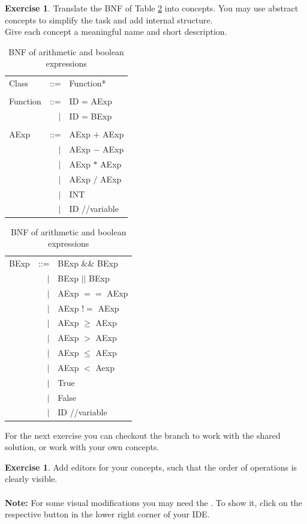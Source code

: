 \documentclass[a4paper,oneside,DIV8,10pt]{scrartcl}
\theoremstyle{definition}
\newtheorem{aufgabe}[satz]{Exercise}
\begin{document}
	\begin{aufgabe}
		Translate the BNF of Table \ref{table:bnf} into concepts. You may use abstract concepts to simplify the task and add internal structure.\\
		Give each concept a meaningful name and short description.
		\begin{table}
			\begin{tabular}{ l r l }
				Class & ::= & Function*\\
				\\
				Function & ::= & ID = AExp\\
				& $|$ & ID = BExp \\
				\\
				AExp & ::= & AExp $+$ AExp\\
					 & $|$ & AExp $-$ AExp\\
					 & $|$ & AExp $*$ AExp\\
					 & $|$ & AExp $/$ AExp\\
					 & $|$ & INT\\
					 & $|$ & ID //variable\\
			\end{tabular}
			\begin{tabular}{ l r l }
			BExp & ::= & BExp $\&\&$ BExp \\
			& $|$ & BExp $||$ BExp\\
			& $|$ & AExp $==$ AExp\\
			& $|$ & AExp $!=$ AExp\\
			& $|$ & AExp $\geq$ AExp\\
			& $|$ & AExp $>$ AExp\\
			& $|$ & AExp $\leq$ AExp\\
			& $|$ & AExp $<$ Aexp\\
			& $|$ & True \\
			& $|$ & False \\
			& $|$ & ID //variable\\
		\end{tabular}
	\caption{BNF of arithmetic and boolean expressions}
	\label{table:bnf}
		\end{table}
	\end{aufgabe}

	For the next exercise you can checkout the branch  to work with the shared solution, or work with your own concepts.

	\begin{aufgabe}
		Add editors for your concepts, such that the order of operations is clearly visible.\\
		\\
		\textbf{Note:} For some visual modifications you may need the . To show it, click on the respective button in the lower right corner of your IDE.
	\end{aufgabe}
\end{document}
